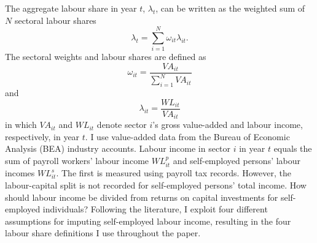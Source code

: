 The aggregate labour share in year $t$, $\lambda_{t}$, can be written as the weighted sum of $N$ sectoral labour shares
\begin{equation}
    \lambda_{t} = \sum_{i=1}^{N}\omega_{it}\lambda_{it}.
\label{eqn:weighted_ls}
\end{equation}
The sectoral weights and labour shares are defined as
\begin{equation}
    \omega_{it} = \frac{VA_{it}}{\sum_{i=1}^{N}VA_{it}}
\end{equation}
and 
\begin{equation}
   \lambda_{it} = \frac{WL_{it}}{VA_{it}} 
\end{equation}
in which $VA_{it}$ and $WL_{it}$ denote sector $i$'s gross value-added and labour income, respectively, in year $t$. I use value-added data from the Bureau of Economic Analysis (BEA) industry accounts. Labour income in sector $i$ in year $t$ equals the sum of payroll workers' labour income $WL_{it}^{p}$ and self-employed persons' labour incomes $WL_{it}^{s}$. The first is measured using payroll tax records. However, the labour-capital split is not recorded for self-employed persons' total income. How should labour income be divided from returns on capital investments for self-employed individuals? Following the literature, I exploit four different assumptions for imputing self-employed labour income, resulting in the four labour share definitions I use throughout the paper. 

